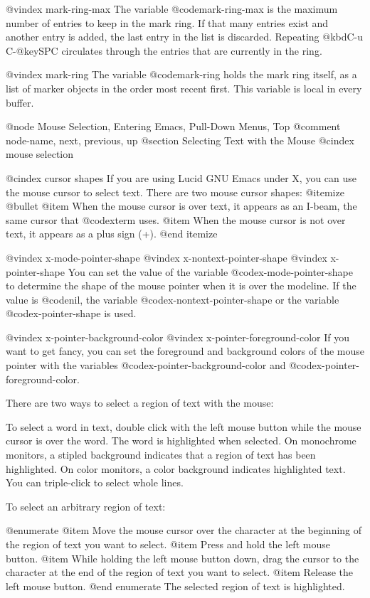 {{{@vindex mark-ring-max
  The variable @code{mark-ring-max} is the maximum number of entries to
keep in the mark ring.  If that many entries exist and another entry is
added, the last entry in the list is discarded.  Repeating @kbd{C-u
C-@key{SPC}} circulates through the entries that are currently in the
ring.

@vindex mark-ring
  The variable @code{mark-ring} holds the mark ring itself, as a list of
marker objects in the order most recent first.  This variable is local
in every buffer.
 
@node Mouse Selection, Entering Emacs, Pull-Down Menus, Top
@comment  node-name,  next,  previous,  up
@section Selecting Text with the Mouse
@cindex mouse selection

@cindex cursor shapes
  If you are using Lucid GNU Emacs under X, you can use the mouse cursor
to select text. There are two mouse cursor shapes:
@itemize @bullet
@item
When the mouse cursor is over text, it appears as an I-beam, the same
cursor that @code{xterm} uses. 
@item
When the mouse cursor is not over text, it appears as a plus sign (+).
@end itemize

@vindex x-mode-pointer-shape
@vindex x-nontext-pointer-shape
@vindex x-pointer-shape
You can set the value of the variable @code{x-mode-pointer-shape} to
determine the shape of the mouse pointer when it is over the modeline.  If
the value is @code{nil}, the variable @code{x-nontext-pointer-shape} or
the variable @code{x-pointer-shape} is used.

@vindex x-pointer-background-color
@vindex x-pointer-foreground-color
If you want to get fancy, you can set the foreground and background
colors of the mouse pointer with the variables
@code{x-pointer-background-color} and @code{x-pointer-foreground-color}.

There are two ways to select a region of text with the mouse:

  To select a word in text, double click with the left mouse button
while the mouse cursor is over the word.  The word is highlighted when
selected. On monochrome monitors, a stipled background indicates that a
region of text has been highlighted. On color monitors, a color
background indicates highlighted text. You can triple-click to select
whole lines. 

To select an arbitrary region of text:

@enumerate
@item
Move the mouse cursor over the character at the beginning of the region of
text you want to select.
@item
Press and hold the left mouse button. 
@item
While holding the left mouse button down, drag the cursor to the
character at the end of the region of text you want to select.
@item
Release the left mouse button.
@end enumerate
The selected region of text is highlighted.

}}}
